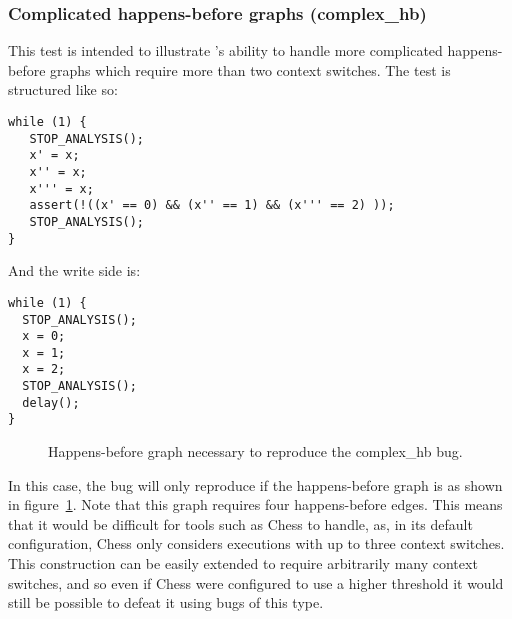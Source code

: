 \subsubsection{Complicated happens-before graphs (complex\_hb)}

This test is intended to illustrate {\technique}'s ability to handle
more complicated happens-before graphs which require more than two
context switches.  The test is structured like so:

\begin{verbatim}
while (1) {
   STOP_ANALYSIS();
   x' = x;
   x'' = x;
   x''' = x;
   assert(!((x' == 0) && (x'' == 1) && (x''' == 2) ));
   STOP_ANALYSIS();
}
\end{verbatim}

And the write side is:

\begin{verbatim}
while (1) {
  STOP_ANALYSIS();
  x = 0;
  x = 1;
  x = 2;
  STOP_ANALYSIS();
  delay();
}
\end{verbatim}

\begin{figure}
  \caption{Happens-before graph necessary to reproduce the complex\_hb
    bug.}
  \label{fig:eval:complex_hb}
\end{figure}

In this case, the bug will only reproduce if the happens-before graph
is as shown in figure~\ref{fig:eval:complex_hb}.  Note that this graph
requires four happens-before edges.  This means that it would be
difficult for tools such as Chess\needCite{} to handle, as, in its
default configuration, Chess only considers executions with up to
three context switches.  This construction can be easily extended to
require arbitrarily many context switches, and so even if Chess were
configured to use a higher threshold it would still be possible to
defeat it using bugs of this type.

